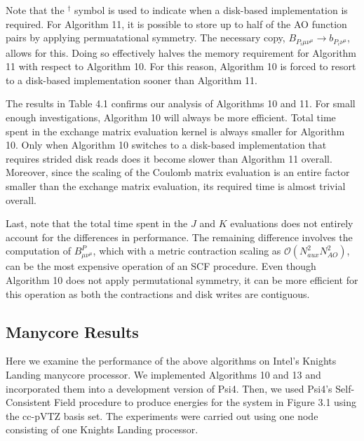 Note that the $^{\dagger}$ symbol is used to indicate when a disk-based implementation is required. For Algorithm 11, it is possible
to store up to half of the AO function pairs by applying permuatational symmetry. The necessary copy, 
$B_{P_i \mu \nu^{\mu}} \rightarrow b_{P_i \nu^{\mu}}$, allows for this. Doing so effectively halves the memory requirement for Algorithm 11
with respect to Algorithm 10. For this reason, Algorithm 10 is forced to resort to a disk-based implementation sooner than Algorithm 11.

The results in Table 4.1 confirms our analysis of Algorithms 10 and 11. For small enough investigations, Algorithm 10 will always be more
efficient. Total time spent in the exchange matrix evaluation kernel is always smaller for Algorithm 10. Only when Algorithm 10 switches to 
a disk-based implementation that requires strided disk reads does it become slower than Algorithm 11 overall. Moreover, since the scaling of
the Coulomb matrix evaluation is an entire factor smaller than the exchange matrix evaluation, its required time is almost trivial overall.

Last, note that the total time spent in the $J$ and $K$ evaluations does not entirely account for the differences in performance. The 
remaining difference involves the computation of $B^P_{\mu \nu^\mu}$, which with a metric contraction scaling as 
$\mathcal{O}(N_{aux}^2N_{AO}^2)$, can be the most expensive operation of an SCF procedure. Even though Algorithm 10 does not 
apply permutational symmetry, it can be more efficient for this operation as both the contractions and disk writes are contiguous.


\subsection{Manycore Results}

Here we examine the performance of the above algorithms on Intel's Knights Landing manycore processor. 
We implemented Algorithms 10 and 13 and incorporated them into a development version of {\sc Psi4}. 
Then, we used {\sc Psi4}'s Self-Consistent Field procedure to produce energies for the system in Figure 3.1 using the cc-pVTZ basis set. 
The experiments were carried out using one node consisting of one Knights Landing processor.

